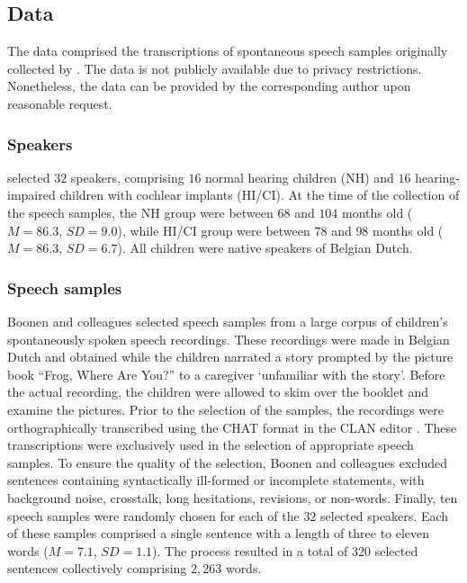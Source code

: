 \documentclass[
  authoryear,
  preprint,
  1p]{elsarticle}
\begin{document}
\subsection{Data}\label{sec-M-D}

The data comprised the transcriptions of spontaneous speech samples
originally collected by \citet{Boonen_et_al_2021}. The data is not
publicly available due to privacy restrictions. Nonetheless, the data
can be provided by the corresponding author upon reasonable request.

\subsubsection{Speakers}\label{sec-M-S}

\citet{Boonen_et_al_2021} selected \(32\) speakers, comprising \(16\)
normal hearing children (NH) and \(16\) hearing-impaired children with
cochlear implants (HI/CI). At the time of the collection of the speech
samples, the NH group were between \(68\) and \(104\) months old
(\(M=86.3\), \(SD=9.0\)), while HI/CI group were between \(78\) and
\(98\) months old (\(M=86.3\), \(SD=6.7\)). {All children were native
speakers of Belgian Dutch.}

\subsubsection{Speech samples}\label{sec-M-SS}

Boonen and colleagues selected speech samples from a large corpus of
children's spontaneously spoken speech recordings. {These recordings
were made in Belgian Dutch and obtained while the children narrated a
story prompted by the picture book ``Frog, Where Are You?''
\citep{Mayer_1969} to a caregiver `unfamiliar with the story'. Before
the actual recording, the children were allowed to skim over the booklet
and examine the pictures. Prior to the selection of the samples, the
recordings were orthographically transcribed using the CHAT format in
the CLAN editor \citep{MacWhinney_2020}. These transcriptions were
exclusively used in the selection of appropriate speech samples.} To
ensure the quality of the selection, Boonen and colleagues excluded
sentences containing syntactically ill-formed or incomplete statements,
with background noise, crosstalk, long hesitations, revisions, or
non-words. Finally, ten speech samples were randomly chosen for each of
the \(32\) selected speakers. Each of these samples comprised a single
sentence with a length of three to eleven words (\(M=7.1\), \(SD=1.1\)).
The process resulted in a total of \(320\) selected sentences
collectively comprising \(2,263\) words.
\end{document}
